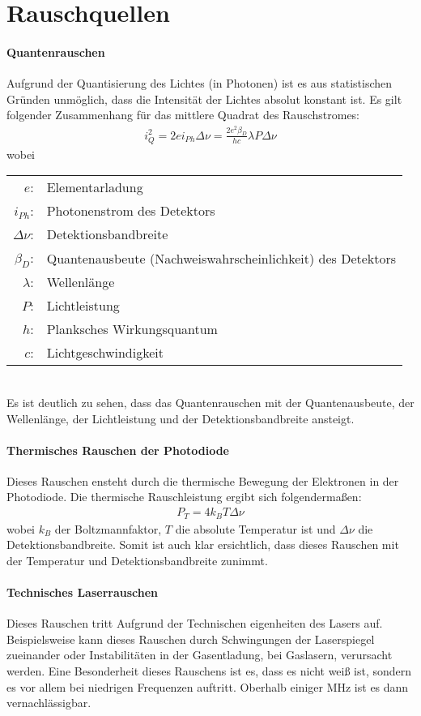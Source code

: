 
\section{Rauschquellen}

\paragraph*{Quantenrauschen}
Aufgrund der Quantisierung des Lichtes (in Photonen) ist es aus statistischen Gründen unmöglich, dass die Intensität der Lichtes absolut konstant ist. Es gilt folgender Zusammenhang für das mittlere Quadrat des Rauschstromes:
\begin{gather}
    i^2_Q = 2ei_{Ph}\Delta \nu = \frac{2e^2\beta_D}{hc}\lambda P \Delta \nu
\end{gather}
wobei\\
\begin{tabular}{rl}
    $e$: & Elementarladung \\
    $i_{Ph}$: & Photonenstrom des Detektors\\
    $\Delta \nu$: & Detektionsbandbreite\\
    $\beta_D$: & Quantenausbeute (Nachweiswahrscheinlichkeit) des Detektors\\
    $\lambda$: & Wellenlänge\\
    $P$: & Lichtleistung\\
    $h$: & Planksches Wirkungsquantum\\
    $c$: & Lichtgeschwindigkeit
\end{tabular}\\
Es ist deutlich zu sehen, dass das Quantenrauschen mit der Quantenausbeute, der Wellenlänge, der Lichtleistung und der Detektionsbandbreite ansteigt.

\paragraph*{Thermisches Rauschen der Photodiode}
Dieses Rauschen ensteht durch die thermische Bewegung der Elektronen in der Photodiode. Die thermische Rauschleistung ergibt sich folgendermaßen:
\begin{gather}
    P_T = 4 k_B T \Delta \nu
\end{gather}
wobei $k_B$ der Boltzmannfaktor, $T$ die absolute Temperatur ist und $\Delta \nu$ die Detektionsbandbreite. Somit ist auch klar ersichtlich, dass dieses Rauschen mit der Temperatur und Detektionsbandbreite zunimmt.


\paragraph*{Technisches Laserrauschen}
Dieses Rauschen tritt Aufgrund der Technischen eigenheiten des Lasers auf. Beispielsweise kann dieses Rauschen durch Schwingungen der Laserspiegel zueinander oder Instabilitäten in der Gasentladung, bei Gaslasern, verursacht werden. Eine Besonderheit dieses Rauschens ist es, dass es nicht weiß ist, sondern es vor allem bei niedrigen Frequenzen auftritt. Oberhalb einiger MHz ist es dann vernachlässigbar. 
